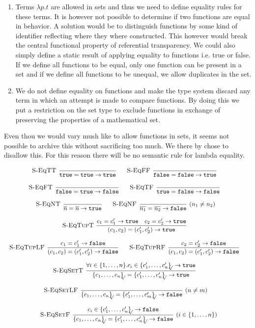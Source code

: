 \documentclass[a4paper]{article}
\newcommand{\s}[1]{\mathtt{#1}}
\newcommand{\sLb}{\s{\{}}
\newcommand{\sRb}{\s{\}}}
\newcommand{\strue}{\s{true}}
\newcommand{\sfalse}{\s{false}}
\newcommand{\sset}[1]{\sLb #1 \sRb}
\newcommand{\ssetc}[1]{\sset{#1}_{\!\!\!\surd}}
\newcommand{\step}{\to}
\renewcommand{\rule}[3][]{\ \mbox{\textsc{#1 }}\dfrac{#2}{#3}\ }
\begin{document}
\begin{enumerate}
\item Terms $\lambda p.t$ are allowed in sets and thus we need to define equality rules for these terms. It is however not possible to determine if two functions are equal in behavior. A solution would be to distinguish functions by some kind of identifier reflecting where they where constructed. This however would break the central functional property of referential transparency. We could also simply define a static result of applying equality to functions i.e. true or false. If we define all functions to be equal, only one function can be present in a set and if we define all functions to be unequal, we allow duplicates in the set. 

\item We do not define equality on functions and make the type system discard any term in which an attempt is made to compare functions. By doing this we put a restriction on the set type to exclude functions in exchange of preserving the properties of a mathematical set.
\end{enumerate}

Even thou we would vary mush like to allow functions in sets, it seems not possible to archive this without sacrificing too much. We there by chose to disallow this. For this reason there will be no semantic rule for lambda equality.


\[\begin{array}{c}
\rule[S-EqTT]{}{\strue = \strue \step \strue}
\quad
\rule[S-EqFF]{}{\sfalse = \sfalse \step \strue}
\quad\\\\
\rule[S-EqFT]{}{\sfalse = \strue \step \sfalse}
\quad
\rule[S-EqTF]{}{\strue = \sfalse \step \sfalse}
\quad\\\\
\rule[S-EqNT]{}{\overline{n} = \overline{n} \step \strue}
\quad
\rule[S-EqNF]{}{\overline{n_1} = \overline{n_2} \step \sfalse} (n_1 \neq n_2)
\quad\\\\
\rule[S-EqTupT]{c_1 = c_1' \step \strue \quad c_2 = c_2' \step \strue}
  {(c_1, c_2) = (c_1', c_2') \step \strue}
\quad\\\\
\rule[S-EqTupLF]{c_1 = c_1' \step \sfalse}
  {(c_1, c_2) = (c_1', c_2') \step \sfalse}
\quad
\rule[S-EqTupRF]{c_2 = c_2' \step \sfalse}
  {(c_1, c_2) = (c_1', c_2') \step \sfalse}
\quad\\\\
\rule[S-EqSetT]{\forall i \in \{1,\ldots,n\}. c_i \in  \ssetc{c'_1,\ldots,c'_n} \step \strue}
  {\ssetc{c_1,\ldots,c_n} = \ssetc{c'_1,\ldots,c'_n} \step \strue}
\quad\\\\
\rule[S-EqSetLF]{}{\ssetc{c_1,\ldots,c_n} = \ssetc{c'_1,\ldots,c'_m} \step \sfalse}(n \neq m)
\quad\\\\
\rule[S-EqSetF]{c_i \in \ssetc{c'_1,\ldots,c'_n} \step \sfalse}
  {\ssetc{c_1,\ldots,c_n} = \ssetc{c'_1,\ldots,c'_n} \step \sfalse}(i \in \{1,\ldots,n\})
\end{array}\]
\end{document}
